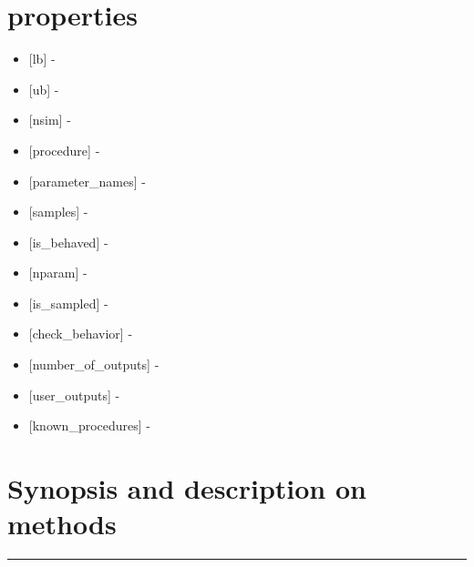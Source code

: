 \documentclass[letterpaper,10pt,english]{sphinxmanual}
\begin{document}
\section{properties}
\label{classes/utils/@mcf/mcf:properties}\begin{itemize}
\item {} 
{[}lb{]} -

\item {} 
{[}ub{]} -

\item {} 
{[}nsim{]} -

\item {} 
{[}procedure{]} -

\item {} 
{[}parameter\_names{]} -

\item {} 
{[}samples{]} -

\item {} 
{[}is\_behaved{]} -

\item {} 
{[}nparam{]} -

\item {} 
{[}is\_sampled{]} -

\item {} 
{[}check\_behavior{]} -

\item {} 
{[}number\_of\_outputs{]} -

\item {} 
{[}user\_outputs{]} -

\item {} 
{[}known\_procedures{]} -

\end{itemize}


\section{Synopsis and description on methods}
\label{classes/utils/@mcf/mcf:synopsis-and-description-on-methods}

\bigskip\hrule{}\bigskip
\end{document}

